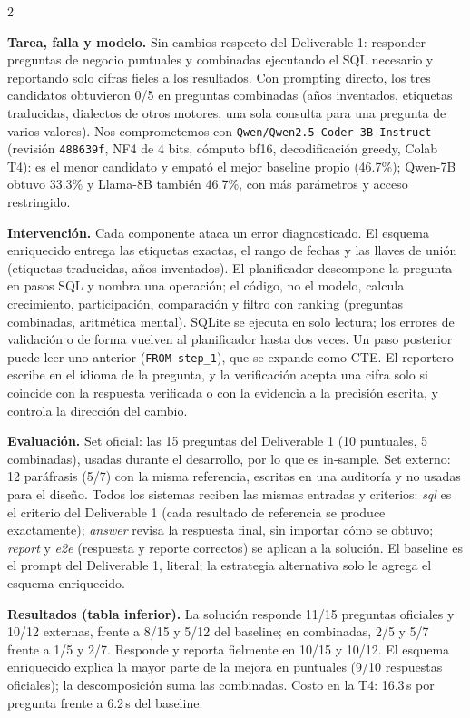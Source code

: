 \documentclass[10pt]{article}
\newcommand{\head}[1]{\textbf{\color{ucblue}#1}\hspace{0.4em}}
\begin{document}
\begin{multicols}{2}
\small

\head{Tarea, falla y modelo.} Sin cambios respecto del Deliverable 1: responder preguntas de
negocio puntuales y combinadas ejecutando el SQL necesario y reportando solo cifras fieles a
los resultados. Con prompting directo, los tres candidatos obtuvieron 0/5 en preguntas combinadas
(a\~nos inventados, etiquetas traducidas, dialectos de otros motores, una sola consulta para una
pregunta de varios valores). Nos comprometemos con \texttt{Qwen/Qwen2.5-Coder-3B-Instruct}
(revisi\'on \texttt{488639f}, NF4 de 4 bits, c\'omputo bf16, decodificaci\'on greedy, Colab T4):
es el menor candidato y empat\'o el mejor baseline propio (46.7\%); Qwen-7B obtuvo 33.3\% y
Llama-8B tambi\'en 46.7\%, con m\'as par\'ametros y acceso restringido.

\head{Intervenci\'on.} Cada componente ataca un error diagnosticado. El esquema enriquecido
entrega las etiquetas exactas, el rango de fechas y las llaves de uni\'on (etiquetas traducidas,
a\~nos inventados). El planificador descompone la pregunta en pasos SQL y nombra una operaci\'on;
el c\'odigo, no el modelo, calcula crecimiento, participaci\'on, comparaci\'on y
filtro con ranking (preguntas combinadas, aritm\'etica mental). SQLite se ejecuta en solo lectura;
los errores de validaci\'on o de forma vuelven al planificador hasta dos veces. Un paso posterior
puede leer uno anterior (\texttt{FROM step\_1}), que se expande como CTE. El reportero escribe en
el idioma de la pregunta, y la verificaci\'on acepta una cifra solo si coincide con la respuesta
verificada o con la evidencia a la precisi\'on escrita, y controla la direcci\'on del cambio.

\head{Evaluaci\'on.} Set oficial: las 15 preguntas del Deliverable 1 (10 puntuales, 5 combinadas),
usadas durante el desarrollo, por lo que es in-sample. Set externo: 12 par\'afrasis (5/7) con la
misma referencia, escritas en una auditor\'ia y no usadas para el dise\~no. Todos los sistemas
reciben las mismas entradas y criterios: \textit{sql} es el criterio del Deliverable 1 (cada
resultado de referencia se produce exactamente); \textit{answer} revisa la respuesta final, sin
importar c\'omo se obtuvo; \textit{report} y \textit{e2e} (respuesta y reporte correctos) se
aplican a la soluci\'on. El baseline es el prompt del Deliverable 1, literal; la estrategia
alternativa solo le agrega el esquema enriquecido.

\head{Resultados (tabla inferior).} La soluci\'on responde 11/15 preguntas oficiales y 10/12
externas, frente a 8/15 y 5/12 del baseline; en combinadas, 2/5 y 5/7 frente a 1/5 y 2/7.
Responde y reporta fielmente en 10/15 y 10/12. El esquema enriquecido explica la mayor parte de
la mejora en puntuales (9/10 respuestas oficiales); la descomposici\'on suma las combinadas.
Costo en la T4: 16.3\,s por pregunta frente a 6.2\,s del baseline.


\end{multicols}
\end{document}
